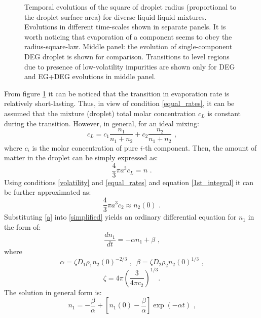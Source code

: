\documentclass[twoside,twocolumn,9pt]{article}
\begin{document}
\begin{figure}[htb]
 \centering
{}
 \caption{Temporal evolutions of the square of droplet radius (proportional to the droplet surface area) for diverse liquid-liquid mixtures. Evolutions in different time-scales shown in separate panels. It is worth noticing that evaporation of a component seems to obey the radius-square-law. Middle panel: the evolution of single-component DEG droplet is shown for comparison. Transitions to level regions due to presence of low-volatility impurities are shown only for DEG and EG+DEG evolutions in middle panel.}
 \label{kinks}
\end{figure}
From figure \ref{kinks} it can be noticed that the transition in evaporation rate is relatively short-lasting. Thus, in view of condition \ref{equal_rates}, it can be assumed that the mixture (droplet) total molar concentration $c_L$ is constant during the transition. However, in general, for an ideal mixing:
\begin{equation}
c_L = c_1 \frac{n_1}{n_1+n_2} + c_2 \frac{n_2}{n_1+n_2} \mbox{~,}
\label{c_L}
\end{equation}
where $c_i$ is the molar concentration of pure $i$-th component.
Then, the amount of matter in the droplet can be simply expressed as:
\begin{equation}
\frac{4}{3}\pi a^3 c_L = n  \mbox{~.}
\label{amount}
\end{equation}
Using conditions \ref{volatility} and \ref{equal_rates} and equation \ref{1st_integral} it can be further approximated as:
\begin{equation}
\frac{4}{3}\pi a^3 c_2 \approx n_{2}(0)  \mbox{~.}
\label{a}
\end{equation}
Substituting \ref{a} into \ref{simplified} yields an ordinary differential equation for $n_1$ in the form of:
\begin{equation}
\frac{dn_1}{dt} = -\alpha n_1 + \beta  \mbox{~,}
\label{n1}
\end{equation}
where
\begin{equation*}
\alpha = \zeta D_1 \rho_1 n_{2}(0)^{-2/3} \mbox{~,~~} 
\beta = \zeta D_2 \rho_2 n_{2}(0)^{1/3} \mbox{~,}
\end{equation*}
\begin{equation*}
\zeta = 4\pi \left( \frac{3}{4\pi c_2} \right) ^{1/3} \mbox{.}
\end{equation*}
The solution in general form is:
\begin{equation}
n_1 = - \frac{\beta}{\alpha} + \left[ n_{1}(0) - \frac{\beta}{\alpha} \right] \exp \left( -\alpha t \right) \mbox{~,}
\end{equation}
\end{document}
